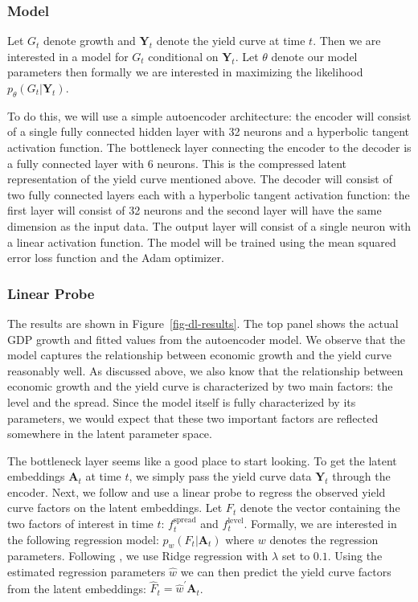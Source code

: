 \documentclass{article}
\theoremstyle{plain}
\theoremstyle{definition}
\theoremstyle{remark}
\begin{document}
\subsubsection{Model}\label{model}

Let \(G_t\) denote growth and \(\mathbf{Y}_t\) denote the yield curve at
time \(t\). Then we are interested in a model for \(G_t\) conditional on
\(\mathbf{Y}_t\). Let \(\theta\) denote our model parameters then
formally we are interested in maximizing the likelihood
\(p_{\theta}(G_t|\mathbf{Y}_t)\). 

To do this, we will use a simple
autoencoder architecture: the encoder will consist of a single fully
connected hidden layer with 32 neurons and a hyperbolic tangent
activation function. The bottleneck layer connecting the encoder to the
decoder is a fully connected layer with 6 neurons. This is the
compressed latent representation of the yield curve mentioned above. The
decoder will consist of two fully connected layers each with a
hyperbolic tangent activation function: the first layer will consist of
32 neurons and the second layer will have the same dimension as the
input data. The output layer will consist of a single neuron with a
linear activation function. The model will be trained using the mean
squared error loss function and the Adam optimizer.

\subsubsection{Linear Probe}\label{linear-probe}

The results are shown in Figure~\ref{fig-dl-results}. The top panel
shows the actual GDP growth and fitted values from the autoencoder
model. We observe that the model captures the relationship between
economic growth and the yield curve reasonably well. As discussed above,
we also know that the relationship between economic growth and the yield
curve is characterized by two main factors: the level and the spread.
Since the model itself is fully characterized by its parameters, we
would expect that these two important factors are reflected somewhere in
the latent parameter space.

The bottleneck layer seems like a good place to start looking. To get
the latent embeddings \(\mathbf{A}_t\) at time \(t\), we simply pass the
yield curve data \(\mathbf{Y}_t\) through the encoder. Next, we follow
\cite{gurnee2023language} and use a linear probe to regress the observed
yield curve factors on the latent embeddings. Let \(F_t\) denote the
vector containing the two factors of interest in time \(t\):
\(f_t^{\text{spread}}\) and \(f_t^{\text{level}}\). Formally, we are
interested in the following regression model:
\(p_{w}(F_t|\mathbf{A}_t)\) where \(w\) denotes the regression
parameters. Following \cite{gurnee2023language}, we use Ridge regression
with \(\lambda\) set to \(0.1\). Using the estimated regression
parameters \(\hat{w}\) we can then predict the yield curve factors from
the latent embeddings: \(\hat{F}_t=\hat{w}^{\prime}\mathbf{A}_t\).
\end{document}

